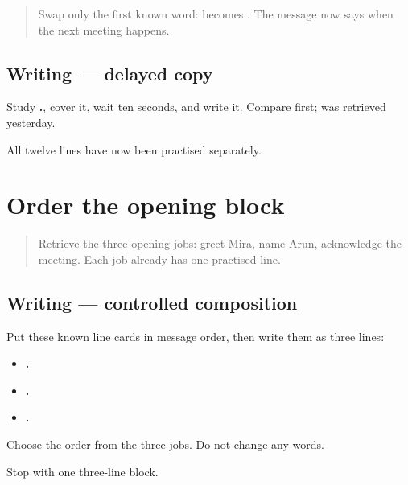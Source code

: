 \begin{quote}
Swap only the first known word: \textbf{ } becomes \textbf{ }. The message now says when the next meeting happens.
\end{quote}

\subsection*{Writing — delayed copy}
Study \textbf{ .}, cover it, wait ten seconds, and write it. Compare \textbf{} first; \textbf{} was retrieved yesterday.

\begin{tcolorbox}[breakable,colback=teal!4,colframe=teal!35!black,title={Before you move on}]
All twelve lines have now been practised separately.
\end{tcolorbox}
\section[opening block]{Order the opening block}

\label{lesson:MR-A1M13-opening-block}



\begin{quote}
Retrieve the three opening jobs: greet Mira, name Arun, acknowledge the meeting. Each job already has one practised line.
\end{quote}

\subsection*{Writing — controlled composition}
Put these known line cards in message order, then write them as three lines:

\begin{itemize}
\raggedright
  \item \textbf{  .}
  \item \textbf{ .}
  \item \textbf{   .}
\end{itemize}

Choose the order from the three jobs. Do not change any words.

\begin{tcolorbox}[breakable,colback=teal!4,colframe=teal!35!black,title={Before you move on}]
Stop with one three-line block.
\end{tcolorbox}
